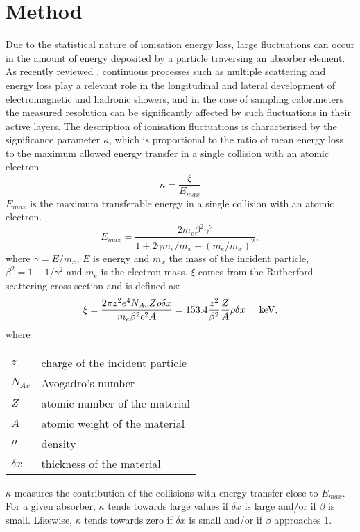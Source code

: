\section{Method}
Due to the statistical nature of ionisation energy loss, large
fluctuations can occur in the amount of energy deposited by a
particle traversing an absorber element.
As recently reviewed \cite{bib-PATR}, continuous processes such as multiple
scattering and energy loss play a relevant role in the longitudinal and
lateral development of electromagnetic and hadronic showers, and
in the case of
sampling calorimeters the measured resolution can be significantly
affected by such fluctuations in their active layers.
The description of ionisation
fluctuations is characterised by the significance parameter $\kappa$,
which is proportional
to the ratio of mean energy loss to the maximum allowed energy transfer
in a single collision with an atomic electron
\[
\kappa =\frac{\xi}{E_{max} }
\]
$ E_{max} $
is the maximum transferable energy in a single collision with
an atomic electron.
\[
E_{max} =\frac{2 m_e \beta^2\gamma^2 }
{1 +  2\gamma m_e/m_x + \left ( m_e/m_x\right)^2},
\]
where $\gamma = E/m_x$, $E$ is energy and
$m_x$ the mass of the incident particle, 
$\beta^2 = 1 - 1/\gamma^2$ and $m_e$ is the electron mass. 
$\xi$ comes from the Rutherford scattering cross  section
and is defined as:
\begin{eqnarray*} \xi  = \frac{ 2\pi z^2 e^4 N_{Av} Z \rho \delta x}
        { m_e \beta^2 c^2 A} =  153.4 \frac{z^2} {\beta^2} \frac{Z}{A}
  \rho \delta x \mbox{\hspace{0.5cm}keV},
\end{eqnarray*}
where

\begin{tabular}{ll}
$z$          & charge of the incident particle \\
$N_{Av}$     & Avogadro's number \\
$Z$          & atomic number of the material \\
$A$          & atomic weight of the material \\
$\rho$       & density \\
$ \delta x$  & thickness of the material \\
\end{tabular}

$\kappa$ measures the contribution of the collisions
with energy transfer close to $E_{max}$.
For a given absorber, $\kappa$ tends towards large
values if
$\delta x$ is large and/or if $\beta$ is small.
Likewise, $\kappa$ tends towards zero if $\delta x $
is small and/or if $\beta$
approaches 1.

